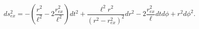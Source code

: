 \begin{equation}
ds_{ex}^{2}=-\left( \frac{r^{2}}{\ell^{2}}-2\frac{r_{ex}^{2}}{
\ell^{2}}\right)dt^{2}+\frac{\ell^{2}r^{2}}{\left( r^{2}-r_{ex}^
{2}\right)^{2}}dr^{2}-2\frac{r_{ex}^{2}}{\ell}dtd\phi +r^{2}d\phi ^{2}.
\label{btze}
\end{equation}


